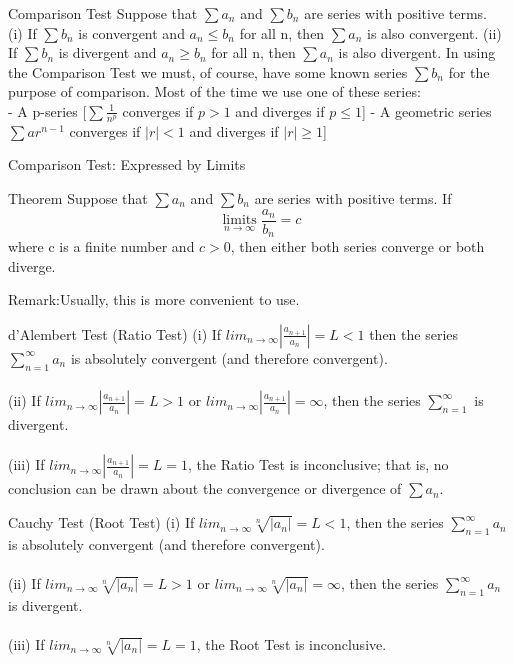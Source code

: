 \begin{frame}{Comparison Test}
    Suppose that $\sum a_n$ and $\sum b_n$ are series with positive terms.\\
    (i) If $\sum b_n$ is convergent and $a_n \leqslant b_n$ for all n, then $\sum a_n$ is also convergent.
    (ii) If $\sum b_n$ is divergent and $a_n \geqslant b_n$ for all n, then $\sum a_n$ is also divergent.
    In using the Comparison Test we must, of course, have some known series $\sum b_n$ for the purpose of comparison. Most of the time we use one of these
    series:\\
    - A p-series [$\sum \frac{1}{n^p}$ converges if $p > 1$ and diverges if $p \leqslant 1$]
    - A geometric series $\sum ar^{n-1}$ converges if $|r| < 1$ and diverges if $|r| \geqslant 1$]
\end{frame}


\begin{frame}{Comparison Test: Expressed by Limits}
    \begin{block}{Theorem}
        Suppose that $\sum a_n$ and $\sum b_n$ are series with positive terms. If
        $$\mathop{limits}\limits_{n \rightarrow \infty} \frac{a_n}{b_n}= c$$
        where c is a finite number and $c > 0$, then either both series converge or both diverge.
    \end{block}
    Remark:Usually, this is more convenient to use.
\end{frame}



\begin{frame}{d’Alembert Test (Ratio Test)}
    (i) If $lim_{n\rightarrow \infty}|\frac{a_{n+1}}{a_n}|=L<1$ then the series $\sum_{n=1}^{\infty} a_n$  is absolutely convergent (and therefore convergent).\\~\\
    (ii) If $lim_{n\rightarrow \infty}|\frac{a_{n+1}}{a_n}|=L>1$ or $lim_{n\rightarrow \infty}|\frac{a_{n+1}}{a_n}|=\infty$, then the series $\sum_{n=1}^{\infty}$ is divergent.\\~\\
    (iii) If $lim_{n\rightarrow \infty}|\frac{a_{n+1}}{a_n}|=L=1$, the Ratio Test is inconclusive; that is, no conclusion can be drawn about the convergence or divergence of $\sum a_n$.
\end{frame}


\begin{frame}{Cauchy Test (Root Test)}
    (i) If $lim_{n \rightarrow \infty} \sqrt[n]{|a_n|} =L<1 $, then the series $\sum _{n=1}^{\infty} a_n$  is absolutely convergent (and therefore convergent).\\~\\
    (ii) If $lim_{n \rightarrow \infty} \sqrt[n]{|a_n|} =L>1 $ or $lim_{n \rightarrow \infty} \sqrt[n]{|a_n|} = \infty $, then the series $\sum _{n=1}^{\infty} a_n$ is divergent.\\~\\
    (iii) If $lim_{n \rightarrow \infty} \sqrt[n]{|a_n|} =L=1 $, the Root Test is inconclusive.
\end{frame}



